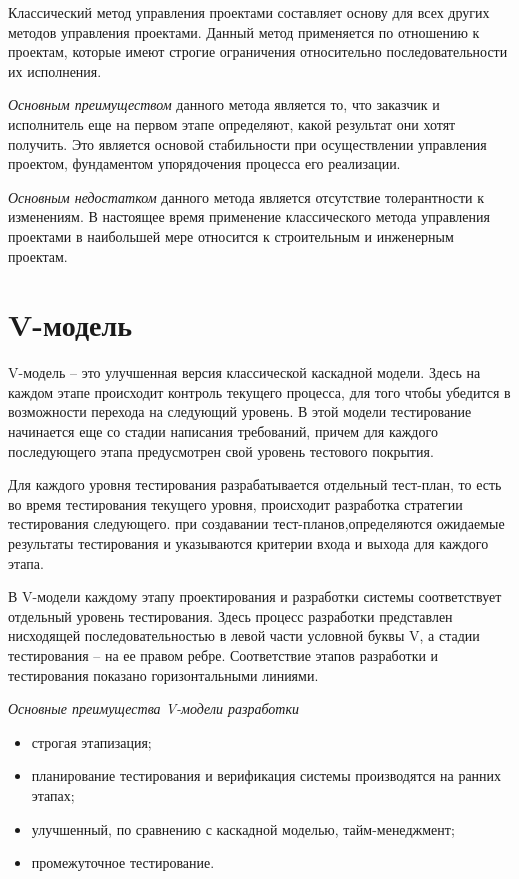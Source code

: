 \documentclass[a4paper,14pt]{extarticle}
\begin{document}
 	Классический метод управления проектами составляет основу для всех других методов управления проектами. Данный метод применяется по отношению к проектам, которые имеют строгие ограничения относительно последовательности их исполнения.
 	
 	\textit{Основным преимуществом} данного метода является то, что заказчик и исполнитель еще на первом этапе определяют, какой результат они хотят получить. Это является основой стабильности при осуществлении управления проектом, фундаментом упорядочения процесса его реализации.
 	
 	\textit{Основным недостатком} данного метода является отсутствие толерантности к изменениям. В настоящее время применение классического метода управления проектами в наибольшей мере относится к строительным и инженерным проектам.
 	
 	\section{V-модель}
 	
 	V-модель – это улучшенная версия классической каскадной модели. Здесь на каждом этапе происходит контроль текущего процесса, для того чтобы убедится в возможности перехода на следующий уровень. В этой модели тестирование начинается еще со стадии написания требований, причем для каждого последующего этапа предусмотрен свой уровень тестового покрытия.
 	
 	Для каждого уровня тестирования разрабатывается отдельный тест-план, то есть во время тестирования текущего уровня, происходит разработка стратегии тестирования следующего. при создавании тест-планов,определяются ожидаемые результаты тестирования и указываются критерии входа и выхода для каждого этапа.
 	
 	В V-модели каждому этапу проектирования и разработки системы соответствует отдельный уровень тестирования. Здесь процесс разработки представлен нисходящей последовательностью в левой части условной буквы V, а стадии тестирования – на ее правом ребре. Соответствие этапов разработки и тестирования показано горизонтальными линиями.
 	
 	\textit{Основные преимущества V-модели разработки}
 	\begin{itemize}
 		\item строгая этапизация;
 		\item планирование тестирования и верификация системы производятся на ранних этапах;
 		\item улучшенный, по сравнению с каскадной моделью, тайм-менеджмент;
 		\item промежуточное тестирование.
 	\end{itemize}
 
\end{document}
